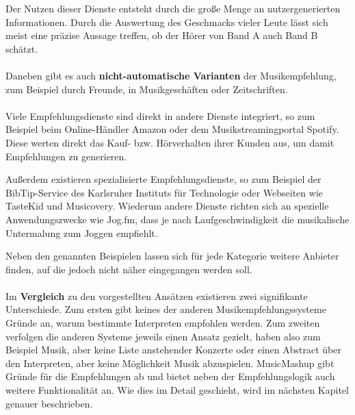 Der Nutzen dieser Dienste entsteht durch die große Menge an nutzergenerierten Informationen. Durch die Auswertung des Geschmacks vieler Leute lässt sich meist eine präzise Aussage treffen, ob der Hörer von Band A auch Band B schätzt.

\paragraph{} Daneben gibt es auch \textbf{nicht-automatische Varianten} der Musikempfehlung, zum Beispiel durch Freunde, in Musikgeschäften oder Zeitschriften.

\paragraph{} Viele Empfehlungsdienste sind direkt in andere Dienste integriert, so zum Beispiel beim Online-Händler Amazon oder dem Musikstreamingportal Spotify. Diese werten direkt das Kauf- bzw. Hörverhalten ihrer Kunden aus, um damit Empfehlungen zu generieren.  

Außerdem existieren spezialisierte Empfehlungsdienste, so zum Beispiel der BibTip-Service des Karlsruher Instituts für Technologie oder Webseiten wie TasteKid und Musicovery. Wiederum andere Dienste richten sich an spezielle Anwendungszwecke wie Jog.fm, dass je nach Laufgeschwindigkeit die musikalische Untermalung zum Joggen empfiehlt.

Neben den genannten Beispielen lassen sich für jede Kategorie weitere Anbieter finden, auf die jedoch nicht näher eingegangen werden soll.

\paragraph{} Im \textbf{Vergleich} zu den vorgestellten Ansätzen existieren zwei signifikante Unterschiede. Zum ersten gibt keines der anderen Musikempfehlungssysteme Gründe an, warum bestimmte Interpreten empfohlen werden. Zum zweiten verfolgen die anderen Systeme jeweils einen Ansatz gezielt, haben also zum Beispiel Musik, aber keine Liste anstehender Konzerte oder einen Abstract über den Interpreten, aber keine Möglichkeit Musik abzuspielen. MusicMashup gibt Gründe für die Empfehlungen ab und bietet neben der Empfehlungslogik auch weitere Funktionalität an. Wie dies im Detail geschieht, wird im nächsten Kapitel genauer beschrieben.